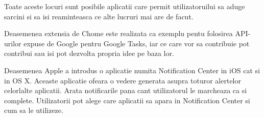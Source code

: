 \documentclass[conference]{IEEEtran}
\begin{document}
Toate aceste locuri sunt posibile aplicatii care permit utilizatoruilui sa aduge sarcini si sa isi reaminteasca ce alte lucruri mai are de facut. 

Deasemenea extensia de Chome este realizata ca exemplu pentu folosirea API-urilor expuse de Google pentru Google Tasks, iar ce care vor sa contribuie pot contribui sau isi pot dezvolta propria idee pe baza lor.

Deasemenea Apple a introdus o aplicatie numita Notification Center in iOS cat si in OS X. Aceaste aplicatie ofeara o vedere generata asupra toturor alertelor celorlalte aplicatii. Arata notificarile pana cant utilizatorul le marcheaza ca si complete. Utilizatorii pot alege care aplicatii sa apara in Notification Center si cum sa le utilizeze. 
\end{document}
